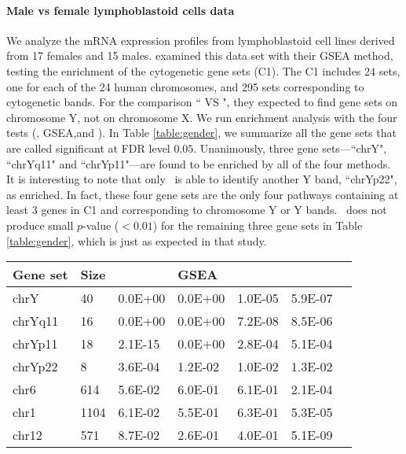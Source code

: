 	
	\paragraph{Male vs female lymphoblastoid cells data}
	We analyze the mRNA expression profiles from lymphoblastoid cell lines derived from 17 females 
	and	15 males. \citet{subramanian2005gene} examined this data set with their GSEA method, 
	testing the enrichment of the  cytogenetic gene sets (C1). The C1 includes 24 sets, one for 
	each of the 24 human chromosomes, and 295 sets corresponding to cytogenetic bands. For the 
	comparison `` VS ", they expected to find gene sets on chromosome Y, 
	not on chromosome X. We run enrichment analysis with the four tests (\OurMethod, GSEA,\CMT and 
	\genr). In Table \ref{table:gender}, we summarize all the gene sets that are called significant 
	at FDR level $0.05$. Unanimously, three gene sets---``chrY", ``chrYq11" and ``chrYp11"---are 
	found to be enriched by all of the four methods. It is interesting to note that only 
	\OurMethod~is able to identify another Y band, ``chrYp22", as enriched. In fact, these four 
	gene sets are the only four pathways containing at least 3 genes in  C1 and corresponding to 
	chromosome Y or Y bands. \OurMethod~does not produce small $p$-value ($<0.01$) for the 
	remaining three gene sets in Table \ref{table:gender}, which is just as expected in that study.
		
	\begin{table*}[!ht]
		\centering
		\caption[Enriched gene sets and their nominal $p$ values for lymphoblastoid cells 
		data]{Enriched gene sets and their nominal $p$ values for lymphoblastoid cells data. 
		Reported
			are gene sets with $\text{FDR}<0.05$ for at least one of the \OurMethod, GSEA, \CMT~and 
			\genr~methods using
			\FDR~(\FDRabb) procedure.}
		\begin{tabular}{p{2cm}p{1cm}p{2cm}p{2cm}p{3cm}p{2cm}p{0.5cm}} \hline
			Gene set & Size & \OurMethod & GSEA & \CMT & \genr \\ 		\hline
			chrY & 40 & 0.0E+00 & 0.0E+00 & 1.0E-05 & 5.9E-07 \\ 
			chrYq11 & 16 & 0.0E+00 & 0.0E+00 & 7.2E-08 & 8.5E-06 \\ 
			chrYp11 & 18 & 2.1E-15 & 0.0E+00 & 2.8E-04 & 5.1E-04 \\ 
			chrYp22 & 8 & 3.6E-04 & 1.2E-02 & 1.0E-02 & 1.3E-02 \\ 
			chr6 & 614 & 5.6E-02 & 6.0E-01 & 6.1E-01 & 2.1E-04 \\ 
			chr1 & 1104 & 6.1E-02 & 5.5E-01 & 6.3E-01 & 5.3E-05 \\ 
			chr12 & 571 & 8.7E-02 & 2.6E-01 & 4.0E-01 & 5.1E-09 \\ 
			\hline
		\end{tabular}
		\label{table:gender}
	\end{table*}
	
